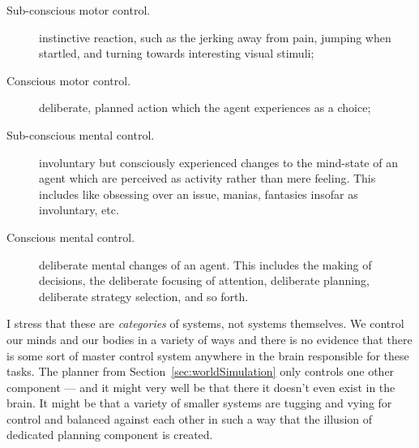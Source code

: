\begin{description}
	\item[Sub-conscious motor control.] instinctive reaction, such as the jerking away from pain, jumping when startled, and turning towards interesting visual stimuli;
	\item[Conscious motor control.] deliberate, planned action which the agent experiences as a choice;
	\item[Sub-conscious mental control.] involuntary but consciously experienced changes to the mind-state of an agent which are perceived as activity rather than mere feeling. This includes like obsessing over an issue, manias, fantasies insofar as involuntary, etc.
	\item[Conscious mental control.] deliberate mental changes of an agent. This includes the making of decisions, the deliberate focusing of attention, deliberate planning, deliberate strategy selection, and so forth.
\end{description}

I stress that these are {\em categories} of systems, not systems themselves. We control our minds and our bodies in a variety of ways and there is no evidence that there is some sort of master control system anywhere in the brain responsible for these tasks. The planner from Section~\ref{sec:worldSimulation} only controls one other component --- and it might very well be that there it doesn't even exist in the brain. It might be that a variety of smaller systems are tugging and vying for control and balanced against each other in such a way that the illusion of dedicated planning component is created.
